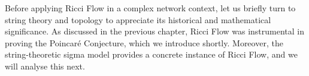 Before applying Ricci Flow in a complex network context, let us briefly turn to string theory and topology to appreciate its historical and mathematical significance. As discussed in the previous chapter, Ricci Flow was instrumental in proving the Poincaré Conjecture, which we introduce shortly. Moreover, the string-theoretic sigma model provides a concrete instance of Ricci Flow, and we will analyse this next.